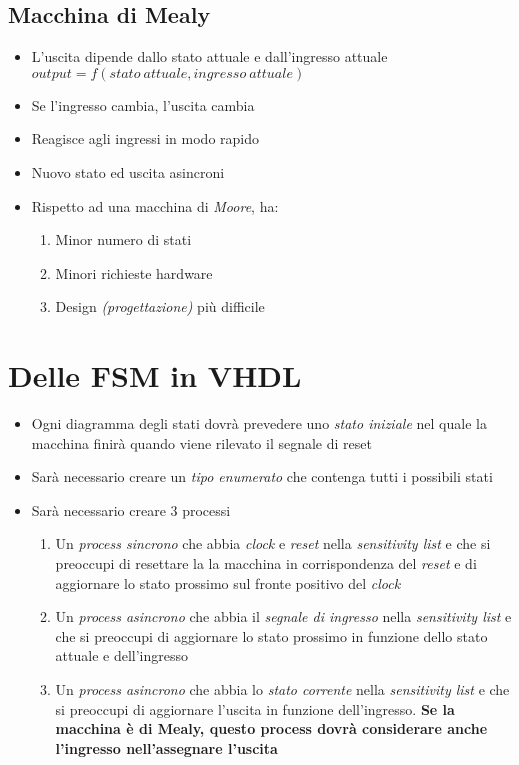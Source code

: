\documentclass{article}
\begin{document}
\subsection{Macchina di Mealy}
\begin{itemize}
	\item L'uscita dipende dallo stato attuale e dall'ingresso attuale \(output=f(stato\:attuale, ingresso\:attuale)\)
	\item Se l'ingresso cambia, l'uscita cambia
	\item Reagisce agli ingressi in modo rapido
	\item Nuovo stato ed uscita asincroni
	\item Rispetto ad una macchina di \textit{Moore}, ha:
	\begin{enumerate}
		\item Minor numero di stati
		\item Minori richieste hardware
		\item Design \textit{(progettazione)} più difficile
	\end{enumerate}
\end{itemize}

\section{Delle FSM in VHDL}
\begin{itemize}
	\item Ogni diagramma degli stati dovrà prevedere uno \textit{stato iniziale} nel quale la macchina finirà quando viene rilevato il segnale di reset
	\item Sarà necessario creare un \textit{tipo enumerato} che contenga tutti i possibili stati
	\item Sarà necessario creare 3 processi
	\begin{enumerate}
		\item Un \textit{process sincrono} che abbia \textit{clock} e \textit{reset} nella \textit{sensitivity list} e che si preoccupi di resettare la la macchina in corrispondenza del \textit{reset} e di aggiornare lo stato prossimo sul fronte positivo del \textit{clock}
		\item Un \textit{process asincrono} che abbia il \textit{segnale di ingresso} nella \textit{sensitivity list} e che si preoccupi di aggiornare lo stato prossimo in funzione dello stato attuale e dell'ingresso
		\item Un \textit{process asincrono} che abbia lo \textit{stato corrente} nella \textit{sensitivity list} e che si preoccupi di aggiornare l'uscita in funzione dell'ingresso. \textbf{Se la macchina è di Mealy, questo process dovrà considerare anche l'ingresso nell'assegnare l'uscita}
	\end{enumerate}
\end{itemize}
\end{document}

